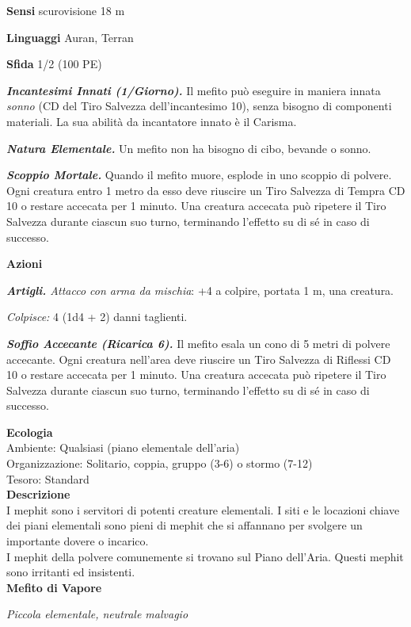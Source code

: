 \begin{multicols}{2}
\textbf{Sensi} scurovisione 18 m

\textbf{Linguaggi} Auran, Terran

\textbf{Sfida} 1/2 (100 PE)

\emph{\textbf{Incantesimi Innati (1/Giorno).}} Il mefito può eseguire in
maniera innata \emph{sonno} (CD del Tiro Salvezza dell'incantesimo 10),
senza bisogno di componenti materiali. La sua abilità da incantatore
innato è il Carisma.

\emph{\textbf{Natura Elementale.}} Un mefito non ha bisogno di cibo,
bevande o sonno.

\emph{\textbf{Scoppio Mortale.}} Quando il mefito muore, esplode in uno scoppio di polvere. Ogni creatura entro 1 metro da esso deve riuscire un Tiro Salvezza di Tempra CD 10 o restare accecata per 1 minuto. Una creatura accecata può ripetere il Tiro Salvezza durante ciascun suo turno, terminando l'effetto su di sé in caso di successo.

\textbf{Azioni}

\emph{\textbf{Artigli.} Attacco con arma da mischia}: +4 a colpire,
portata 1 m, una creatura.

\emph{Colpisce:} 4 (1d4 + 2) danni taglienti.

\emph{\textbf{Soffio Accecante (Ricarica 6).}} Il mefito esala un cono di 5 metri di polvere accecante. Ogni creatura nell'area deve riuscire un Tiro Salvezza di Riflessi CD 10 o restare accecata per 1 minuto. Una creatura accecata può ripetere il Tiro Salvezza durante ciascun suo turno, terminando l'effetto su di sé in caso di successo.

\textbf{Ecologia}\\
Ambiente: Qualsiasi (piano elementale dell'aria)\\
Organizzazione: Solitario, coppia, gruppo (3-6) o stormo (7-12)\\
Tesoro: Standard\\
\textbf{Descrizione}\\
I mephit sono i servitori di potenti creature elementali. I siti e le locazioni chiave dei piani elementali sono pieni di mephit che si affannano per svolgere un importante dovere o incarico.\\
I mephit della polvere comunemente si trovano sul Piano dell'Aria. Questi mephit sono irritanti ed insistenti.\\

\medskip{}\textbf{Mefito di Vapore}

\emph{Piccola elementale, neutrale malvagio}


\end{multicols}
